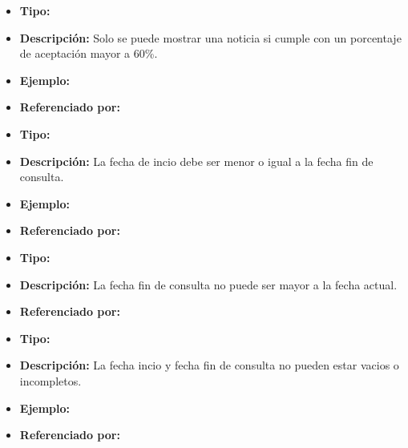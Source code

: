 
    \begin{itemize}
      \item \textbf{Tipo:}  
      \item \textbf{Descripción:} Solo se puede mostrar una noticia si cumple con un porcentaje de aceptación mayor a 60\%.
      \item \textbf{Ejemplo:}
      \item \textbf{Referenciado por:}  \\
    \end{itemize}


    \begin{itemize}
      \item \textbf{Tipo:}  
      \item \textbf{Descripción:} La fecha de incio debe ser menor o igual a la fecha fin de consulta.
      \item \textbf{Ejemplo:}
      \item \textbf{Referenciado por:}  \\
    \end{itemize}



    \begin{itemize}
      \item \textbf{Tipo:}  
      \item \textbf{Descripción:} La fecha fin de consulta no puede ser mayor a la fecha actual.
      \item \textbf{Referenciado por:}  \\
    \end{itemize}


    \begin{itemize}
      \item \textbf{Tipo:}  
      \item \textbf{Descripción:} La fecha incio y fecha fin de consulta no pueden estar vacios o incompletos.
      \item \textbf{Ejemplo:}
      \item \textbf{Referenciado por:}  \\
    \end{itemize}

